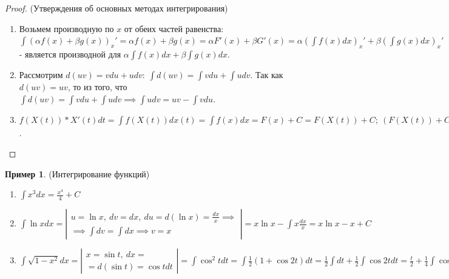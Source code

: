 \documentclass{report}
\theoremstyle{definition}
\newtheorem{example}{Пример}
\begin{document}
\begin{proof}
  (Утверждения об основных методах интегрирования)
  \begin{enumerate}
    \item Возьмем производную по \(x\) от обеих частей равенства: \(\int(\alpha f(x) +
          \beta g(x))_{x}' = \alpha f(x) + \beta g(x) = \alpha F'(x) + \beta G'(x) =
          \alpha(\int f(x) dx)_{x}' + \beta(\int g(x) dx)_{x}'\) - является производной для
          \(\alpha \int f(x) dx + \beta \int g(x) dx\).
    \item Рассмотрим \(d(uv) = v du + u dv: \ \int d(uv) = \int v du + \int u dv\).
          Так как \(d(uv) = uv\), то из того, что \(\int d(uv) = \int v du + \int u dv
          \implies \int u dv = uv - \int v du\).
    \item \(f(X(t)) * X'(t) dt = \int f(X(t)) dx(t) = \int f(x) dx = F(x) + C =
          F(X(t)) + C; \ (F(X(t)) + C)_{t}' = F_{t}' * X_{t}' = f(x) * X'(t) =
          (\int f(X(t)) * X'(t) dt)_{t}'\).
  \end{enumerate}
\end{proof}

\begin{example}
  (Интегрирование функций)
  \begin{enumerate}
    \item \(\int x^{3} dx = \frac{x^{4}}{4} + C\)
    \item \(\int \ln x dx =
          \left|
          \begin{array}{c}
            u = \ln x, \ dv = dx, \ du = d(\ln x) = \frac{dx}{x} \implies \\
            \implies \int dv = \int dx \implies v = x
          \end{array}
          \right| = x \ln x - \int x \frac{dx}{x} = x \ln x - x + C\)
    \item \(\int \sqrt{1 - x^{2}} dx =
          \left|
          \begin{array}{c}
            x = \sin t, \ dx = \\
            = d(\sin t) = \cos t dt
          \end{array}
          \right| = \int \cos^{2} t dt = \int \frac{1}{2}(1 + \cos 2t) dt = \frac{1}{2} \int dt + \frac{1}{2} \int \cos 2t dt =
          \frac{t}{2} + \frac{1}{4} \int \cos 2t d(2t) = \frac{t}{2} + \frac{1}{4} \sin 2t + C = \frac{\arcsin x}{2} +
          \frac{1}{2} x \sqrt{1 - x^{2}} + C\)
  \end{enumerate}
\end{example}
\end{document}
